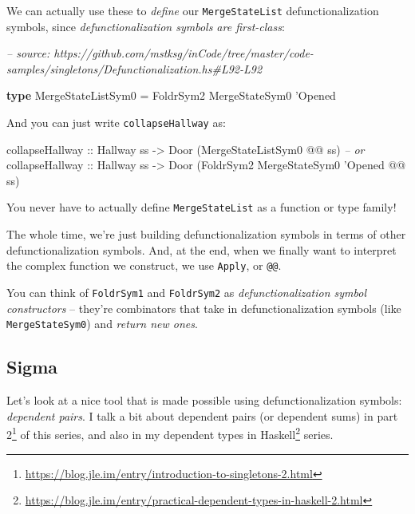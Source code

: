 \documentclass[]{article}
\newenvironment{Shaded}{}{}
\newcommand{\CommentTok}[1]{\textcolor[rgb]{0.38,0.63,0.69}{\textit{#1}}}
\newcommand{\DataTypeTok}[1]{\textcolor[rgb]{0.56,0.13,0.00}{#1}}
\newcommand{\FunctionTok}[1]{\textcolor[rgb]{0.02,0.16,0.49}{#1}}
\newcommand{\KeywordTok}[1]{\textcolor[rgb]{0.00,0.44,0.13}{\textbf{#1}}}
\newcommand{\NormalTok}[1]{#1}
\newcommand{\OtherTok}[1]{\textcolor[rgb]{0.00,0.44,0.13}{#1}}
\renewcommand{\href}[2]{#2\footnote{\url{#1}}}
\begin{document}
We can actually use these to \emph{define} our \texttt{MergeStateList}
defunctionalization symbols, since \emph{defunctionalization symbols are
first-class}:

\begin{Shaded}
\begin{Highlighting}[]
\CommentTok{-- source: https://github.com/mstksg/inCode/tree/master/code-samples/singletons/Defunctionalization.hs#L92-L92}

\KeywordTok{type} \DataTypeTok{MergeStateListSym0} \FunctionTok{=} \DataTypeTok{FoldrSym2} \DataTypeTok{MergeStateSym0}\NormalTok{ '}\DataTypeTok{Opened}
\end{Highlighting}
\end{Shaded}

And you can just write \texttt{collapseHallway} as:

\begin{Shaded}
\begin{Highlighting}[]
\OtherTok{collapseHallway ::} \DataTypeTok{Hallway}\NormalTok{ ss }\OtherTok{->} \DataTypeTok{Door}\NormalTok{ (}\DataTypeTok{MergeStateListSym0} \FunctionTok{@@}\NormalTok{ ss)}
\CommentTok{-- or}
\OtherTok{collapseHallway ::} \DataTypeTok{Hallway}\NormalTok{ ss }\OtherTok{->} \DataTypeTok{Door}\NormalTok{ (}\DataTypeTok{FoldrSym2} \DataTypeTok{MergeStateSym0}\NormalTok{ '}\DataTypeTok{Opened} \FunctionTok{@@}\NormalTok{ ss)}
\end{Highlighting}
\end{Shaded}

You never have to actually define \texttt{MergeStateList} as a function or type
family!

The whole time, we're just building defunctionalization symbols in terms of
other defunctionalization symbols. And, at the end, when we finally want to
interpret the complex function we construct, we use \texttt{Apply}, or
\texttt{@@}.

You can think of \texttt{FoldrSym1} and \texttt{FoldrSym2} as
\emph{defunctionalization symbol constructors} -- they're combinators that take
in defunctionalization symbols (like \texttt{MergeStateSym0}) and \emph{return
new ones}.

\hypertarget{sigma}{%
\subsection{Sigma}\label{sigma}}

Let's look at a nice tool that is made possible using defunctionalization
symbols: \emph{dependent pairs}. I talk a bit about dependent pairs (or
dependent sums) in
\href{https://blog.jle.im/entry/introduction-to-singletons-2.html}{part 2} of
this series, and also in my
\href{https://blog.jle.im/entry/practical-dependent-types-in-haskell-2.html}{dependent
types in Haskell} series.
\end{document}
